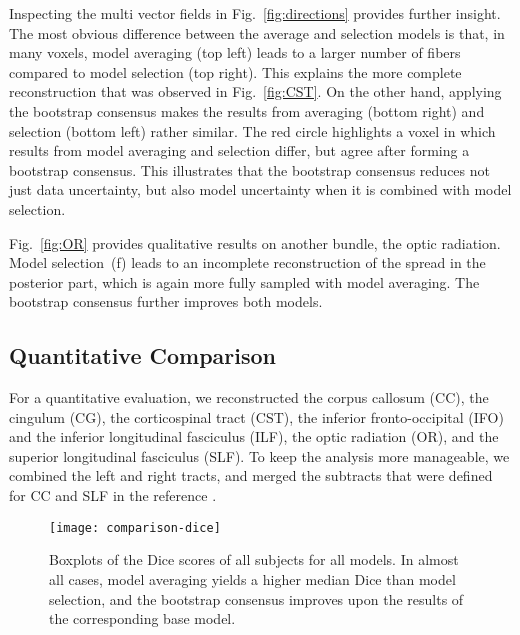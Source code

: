 Inspecting the multi vector fields in Fig.~\ref{fig:directions} provides further insight. The most obvious difference between the average and
selection models is that, in many voxels, model averaging (top left) leads to a larger number of fibers compared to model selection (top right). This explains the more complete reconstruction that was observed in Fig.~\ref{fig:CST}. 
On the other hand, applying the bootstrap consensus makes the results from averaging (bottom right) and selection (bottom left) rather similar. The red circle highlights a voxel in which results from model averaging and selection differ, but agree after forming a bootstrap consensus. This illustrates that the bootstrap consensus reduces not just data uncertainty, but also model uncertainty when it is combined with model selection.

Fig.~\ref{fig:OR} provides qualitative results on another bundle, the optic radiation. Model selection~(f) leads to an incomplete reconstruction of the spread in the posterior part, which is again more fully sampled with model averaging. The bootstrap consensus further improves both models.

\subsection{Quantitative Comparison}

For a quantitative evaluation, we reconstructed the corpus callosum (CC), the
cingulum (CG), the corticospinal tract (CST), the inferior fronto-occipital (IFO)
and the inferior longitudinal fasciculus (ILF), the optic radiation (OR), and
the superior longitudinal fasciculus (SLF). To keep the analysis more manageable, we combined the left and right tracts, and merged the subtracts that were defined for CC and SLF in the reference \cite{WASSERTHAL2018239}.

\begin{figure}
	\centering
	\texttt{[image: comparison-dice]}
	\caption{Boxplots of the Dice scores of all subjects for all models. In almost all cases, model averaging yields a higher median Dice than model selection, and the bootstrap consensus improves upon the results of the corresponding base model.}
	\label{fig:Dice}
\end{figure}

